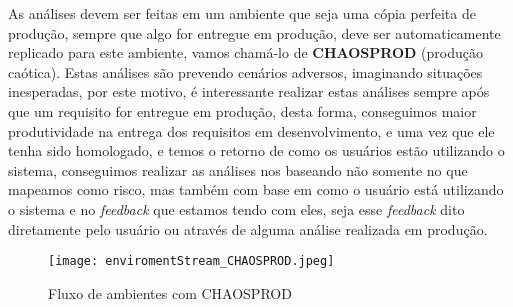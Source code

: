     As análises devem ser feitas em um ambiente que seja uma cópia perfeita de
    produção, sempre que algo for entregue em produção, deve ser automaticamente
    replicado para este ambiente, vamos chamá-lo de \textbf{CHAOSPROD} (produção
    caótica). \newline
    Estas análises são prevendo cenários adversos, imaginando situações inesperadas,
    por este motivo, é interessante realizar estas análises sempre após que um
    requisito for entregue em produção, desta forma, conseguimos maior produtividade
    na entrega dos requisitos em desenvolvimento, e uma vez que ele tenha sido
    homologado, e temos o retorno de como os usuários estão utilizando o sistema,
    conseguimos realizar as análises nos baseando não somente no que mapeamos como
    risco, mas também com base em como o usuário está utilizando o sistema e no
    \textit{feedback} que estamos tendo com eles, seja esse \textit{feedback} dito
    diretamente pelo usuário ou através de alguma análise realizada em produção.

    \begin{figure}[!h]
      \centering
      \texttt{[image: enviromentStream\_CHAOSPROD.jpeg]}
      \caption{Fluxo de ambientes com CHAOSPROD}
      \label{Imagem:2}
    \end{figure}

